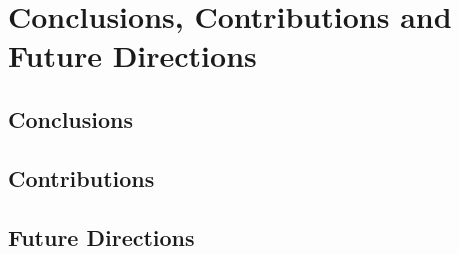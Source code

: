 
\chapter{Conclusions, Contributions and Future Directions}

\section{Conclusions}
\section{Contributions}
\section{Future Directions}


